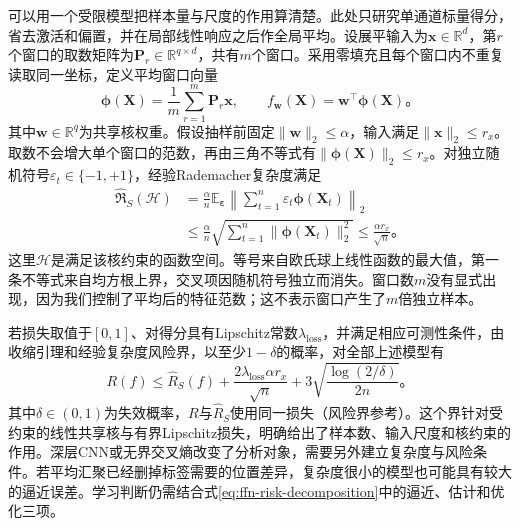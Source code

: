 可以用一个受限模型把样本量与尺度的作用算清楚。此处只研究单通道标量得分，省去激活和偏置，并在局部线性响应之后作全局平均。设展平输入为$\bm x\in\mathbb R^d$，第$r$个窗口的取数矩阵为$\bm P_r\in\mathbb R^{q\times d}$，共有$m$个窗口。采用零填充且每个窗口内不重复读取同一坐标，定义平均窗口向量
\begin{equation}
  \bm\phi(\bm X)=\frac1m\sum_{r=1}^{m}\bm P_r\bm x,
  \qquad f_{\bm w}(\bm X)=\bm w^\top\bm\phi(\bm X)\text{。}
  \label{eq:cnn-pooled-linear-model}
\end{equation}
其中$\bm w\in\mathbb R^q$为共享核权重。假设抽样前固定$\lVert\bm w\rVert_2\leq\alpha$，输入满足$\lVert\bm x\rVert_2\leq r_x$。取数不会增大单个窗口的范数，再由三角不等式有$\lVert\bm\phi(\bm X)\rVert_2\leq r_x$。对独立随机符号$\varepsilon_t\in\{-1,+1\}$，经验Rademacher复杂度满足
\begin{equation}
  \begin{aligned}
    \widehat{\mathfrak R}_S(\mathcal H)
    &=\frac\alpha n\mathbb E_{\bm\varepsilon}
           \left\lVert\sum_{t=1}^{n}\varepsilon_t\bm\phi(\bm X_t)\right\rVert_2\\
    &\leq\frac\alpha n
         \sqrt{\sum_{t=1}^{n}\lVert\bm\phi(\bm X_t)\rVert_2^2}
     \leq\frac{\alpha r_x}{\sqrt n}\text{。}
  \end{aligned}
  \label{eq:cnn-pooled-rademacher}
\end{equation}
这里$\mathcal H$是满足该核约束的函数空间。等号来自欧氏球上线性函数的最大值，第一条不等式来自均方根上界，交叉项因随机符号独立而消失。窗口数$m$没有显式出现，因为我们控制了平均后的特征范数；这不表示窗口产生了$m$倍独立样本。

若损失取值于$[0,1]$、对得分具有Lipschitz常数$\lambda_{\mathrm{loss}}$，并满足相应可测性条件，由收缩引理和经验复杂度风险界，以至少$1-\delta$的概率，对全部上述模型有
\begin{equation}
  R(f)\leq\widehat R_S(f)
    +\frac{2\lambda_{\mathrm{loss}}\alpha r_x}{\sqrt n}
    +3\sqrt{\frac{\log(2/\delta)}{2n}}\text{。}
  \label{eq:cnn-pooled-risk-bound}
\end{equation}
其中$\delta\in(0,1)$为失效概率，$R$与$\widehat R_S$使用同一损失（风险界参考）。这个界针对受约束的线性共享核与有界Lipschitz损失，明确给出了样本数、输入尺度和核约束的作用。深层CNN或无界交叉熵改变了分析对象，需要另外建立复杂度与风险条件。若平均汇聚已经删掉标签需要的位置差异，复杂度很小的模型也可能具有较大的逼近误差。学习判断仍需结合式\eqref{eq:ffn-risk-decomposition}中的逼近、估计和优化三项。

